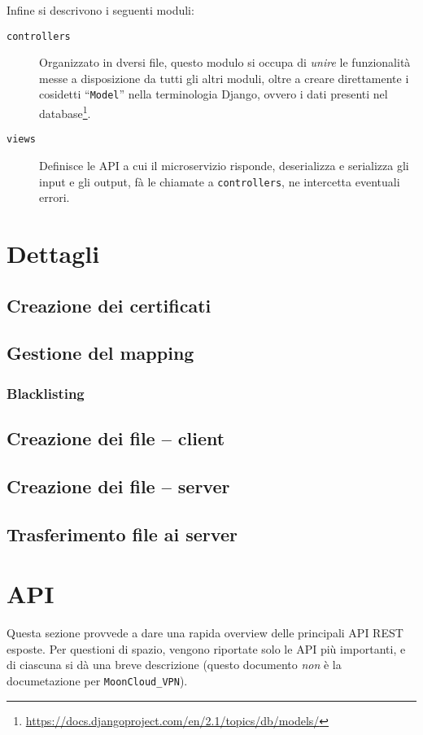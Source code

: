 Infine si descrivono i seguenti moduli:
\begin{description}
  \item[\texttt{controllers}]Organizzato in dversi file, questo modulo si occupa di
  \textit{unire} le funzionalità messe a disposizione da tutti gli altri moduli,
  oltre a creare direttamente i cosidetti ``\texttt{Model}'' nella terminologia Django,
  ovvero i dati presenti nel database\footnote{\url{https://docs.djangoproject.com/en/2.1/topics/db/models/}}.
  \item[\texttt{views}]Definisce le API a cui il microservizio risponde, deserializza e serializza
  gli input e gli output, fà le chiamate a \texttt{controllers}, ne intercetta eventuali errori.
\end{description}


\section{Dettagli}

\subsection{Creazione dei certificati}

\subsection{Gestione del mapping}

\subsubsection{Blacklisting}

\subsection{Creazione dei file -- client}

\subsection{Creazione dei file -- server}

\subsection{Trasferimento file ai server}

\section{API}
Questa sezione provvede a dare una rapida overview delle principali API REST
esposte. Per questioni di spazio, vengono riportate solo le API più importanti,
e di ciascuna si dà una breve descrizione (questo documento \textit{non} è
la documetazione per \texttt{MoonCloud\_VPN}).

